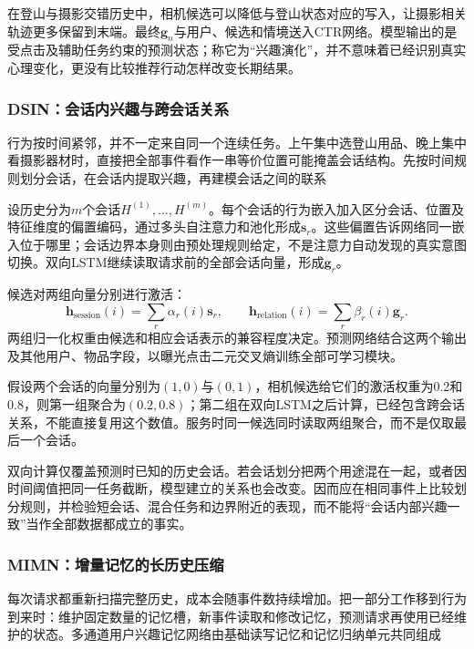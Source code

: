 在登山与摄影交错历史中，相机候选可以降低与登山状态对应的写入，让摄影相关轨迹更多保留到末端。最终$\bm{g}_n$与用户、候选和情境送入CTR网络。模型输出的是受点击及辅助任务约束的预测状态；称它为“兴趣演化”，并不意味着已经识别真实心理变化，更没有比较推荐行动怎样改变长期结果。

\subsubsection{DSIN：会话内兴趣与跨会话关系}
\label{sec:rs-dsin}

行为按时间紧邻，并不一定来自同一个连续任务。上午集中选登山用品、晚上集中看摄影器材时，直接把全部事件看作一串等价位置可能掩盖会话结构。先按时间规则划分会话，在会话内提取兴趣，再建模会话之间的联系

设历史分为$m$个会话$H^{(1)},\ldots,H^{(m)}$。每个会话的行为嵌入加入区分会话、位置及特征维度的偏置编码，通过多头自注意力和池化形成$\bm{s}_r$。这些偏置告诉网络同一嵌入位于哪里；会话边界本身则由预处理规则给定，不是注意力自动发现的真实意图切换。双向LSTM继续读取请求前的全部会话向量，形成$\bm{g}_r$。

候选对两组向量分别进行激活：
\begin{equation}
  \bm{h}_{\mathrm{session}}(i)=\sum_r\alpha_r(i)\bm{s}_r,\qquad
  \bm{h}_{\mathrm{relation}}(i)=\sum_r\beta_r(i)\bm{g}_r.
  \label{eq:rs-dsin-pooling}
\end{equation}
两组归一化权重由候选和相应会话表示的兼容程度决定。预测网络结合这两个输出及其他用户、物品字段，以曝光点击二元交叉熵训练全部可学习模块。

假设两个会话的向量分别为$(1,0)$与$(0,1)$，相机候选给它们的激活权重为0.2和0.8，则第一组聚合为$(0.2,0.8)$；第二组在双向LSTM之后计算，已经包含跨会话关系，不能直接复用这个数值。服务时同一候选同时读取两组聚合，而不是仅取最后一个会话。

双向计算仅覆盖预测时已知的历史会话。若会话划分把两个用途混在一起，或者因时间阈值把同一任务截断，模型建立的关系也会改变。因而应在相同事件上比较划分规则，并检验短会话、混合任务和边界附近的表现，而不能将“会话内部兴趣一致”当作全部数据都成立的事实。

\subsubsection{MIMN：增量记忆的长历史压缩}
\label{sec:rs-mimn}

每次请求都重新扫描完整历史，成本会随事件数持续增加。把一部分工作移到行为到来时：维护固定数量的记忆槽，新事件读取和修改记忆，预测请求再使用已经维护的状态。多通道用户兴趣记忆网络由基础读写记忆和记忆归纳单元共同组成

